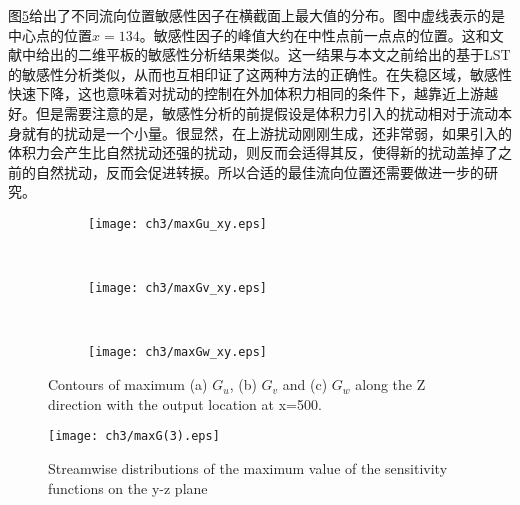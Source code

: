 图\ref{f:maxsen}给出了不同流向位置敏感性因子在横截面上最大值的分布。图中虚线表示的是中心点的位置$x=134$。敏感性因子的峰值大约在中性点前一点点的位置。这和文献\cite{pralits2000sensitivity}中给出的二维平板的敏感性分析结果类似。这一结果与本文之前给出的基于LST的敏感性分析类似，从而也互相印证了这两种方法的正确性。在失稳区域，敏感性快速下降，这也意味着对扰动的控制在外加体积力相同的条件下，越靠近上游越好。但是需要注意的是，敏感性分析的前提假设是体积力引入的扰动相对于流动本身就有的扰动是一个小量。很显然，在上游扰动刚刚生成，还非常弱，如果引入的体积力会产生比自然扰动还强的扰动，则反而会适得其反，使得新的扰动盖掉了之前的自然扰动，反而会促进转捩。所以合适的最佳流向位置还需要做进一步的研究。
\begin{figure}[H]
  \centering
  \begin{subfigure}{\textwidth}
  \texttt{[image: ch3/maxGu\_xy.eps]}
  \caption{\label{f:Gu_xy}}
  \end{subfigure}\\
  \bigskip
  \begin{subfigure}{\textwidth}
  \texttt{[image: ch3/maxGv\_xy.eps]}
  \caption{\label{f:Gv_xy}}
  \end{subfigure}\\
  \bigskip
  \begin{subfigure}{\textwidth}
  \texttt{[image: ch3/maxGw\_xy.eps]}
  \caption{\label{f:Gw_xy}}
  \end{subfigure}
  \caption{Contours of maximum (a) $G_u$, (b) $G_v$ and (c) $G_w$ along the Z direction with the output location at x=500.}\label{f:Guvw_xy}
\end{figure}
\begin{figure}[htb]
  \centering
  \texttt{[image: ch3/maxG(3).eps]}\\
  \caption{Streamwise distributions of the maximum value of the sensitivity functions on the y-z plane}\label{f:maxsen}
\end{figure}

